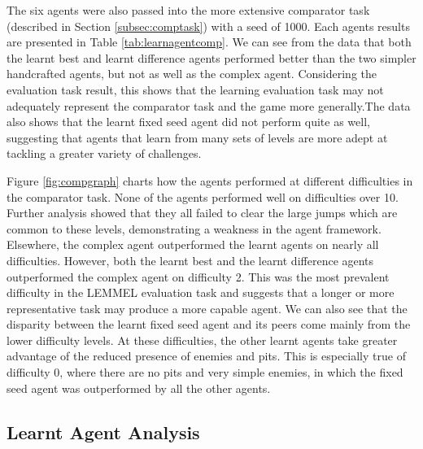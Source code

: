 The six agents were also passed into the more extensive comparator task (described in Section \ref{subsec:comptask}) with a seed of 1000. Each agents results are presented in Table \ref{tab:learnagentcomp}. We can see from the data that both the learnt best and learnt difference agents performed better than the two simpler handcrafted agents, but not as well as the complex agent. Considering the evaluation task result, this shows that the learning evaluation task may not adequately represent the comparator task and the game more generally.The data also shows that the learnt fixed seed agent did not perform quite as well, suggesting that agents that learn from many sets of levels are more adept at tackling a greater variety of challenges.

Figure \ref{fig:compgraph} charts how the agents performed at different difficulties in the comparator task. None of the agents performed well on difficulties over 10. Further analysis showed that they all failed to clear the large jumps which are common to these levels, demonstrating a weakness in the agent framework. Elsewhere, the complex agent outperformed the learnt agents on nearly all difficulties. However, both the learnt best and the learnt difference agents outperformed the complex agent on difficulty 2. This was the most prevalent difficulty in the LEMMEL evaluation task and suggests that a longer or more representative task may produce a more capable agent. We can also see that the disparity between the learnt fixed seed agent and its peers come mainly from the lower difficulty levels. At these difficulties, the other learnt agents take greater advantage of the reduced presence of enemies and pits. This is especially true of difficulty 0, where there are no pits and very simple enemies, in which the fixed seed agent was outperformed by all the other agents.



\subsection{Learnt Agent Analysis}
\label{subsec:evallearn2}


